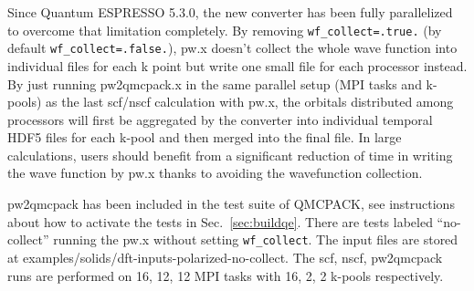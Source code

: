 Since Quantum ESPRESSO 5.3.0, the new converter has been fully parallelized to overcome that limitation completely.
By removing \texttt{wf\_collect=.true.} (by default \texttt{wf\_collect=.false.}), pw.x doesn't collect the whole wave function into individual files for each k point but write one small file for each processor instead.
By just running pw2qmcpack.x in the same parallel setup (MPI tasks and k-pools) as the last scf/nscf calculation with pw.x,
the orbitals distributed among processors will first be aggregated by the converter into individual temporal HDF5 files for each k-pool and then merged into the final file.
In large calculations, users should benefit from a significant reduction of time in writing the wave function by pw.x thanks to avoiding the wavefunction collection.

pw2qmcpack has been included in the test suite of QMCPACK, see instructions about how to activate the tests in Sec.~\ref{sec:buildqe}.
There are tests labeled ``no-collect'' running the pw.x without setting \texttt{wf\_collect}.
The input files are stored at examples/solids/dft-inputs-polarized-no-collect.
The scf, nscf, pw2qmcpack runs are performed on 16, 12, 12 MPI tasks with 16, 2, 2 k-pools respectively.

